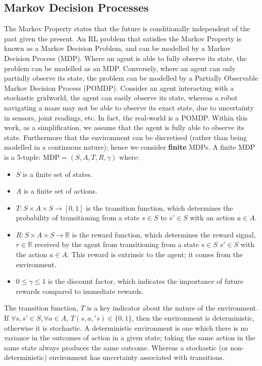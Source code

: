 \subsection{Markov Decision Processes}
The Markov Property states that the future is conditionally independent of the past given the present. An RL problem that satisfies the Markov Property is known as a Markov Decision Problem, and can be modelled by a Markov Decision Process (MDP). Where an agent is able to fully observe its state, the problem can be modelled as an MDP. Conversely, where an agent can only partially observe its state, the problem can be modelled by a Partially Observable Markov Decision Process (POMDP). Consider an agent interacting with a stochastic gridworld, the agent can easily observe its state, whereas a robot navigating a maze may not be able to observe its exact state, due to uncertainty in sensors, joint readings, etc. In fact, the real-world is a POMDP. Within this work, as a simplification, we assume that the agent is fully able to observe its state. Furthermore that the environment can be discretised (rather than being modelled in a continuous nature); hence we consider \textbf{finite} MDPs.
A finite MDP is a 5-tuple: $\text{MDP} = (S,A,T,R, \gamma)$ where:
\begin{itemize}
    \item $S$ is a finite set of states.
    \item $A$ is a finite set of actions.
    \item $T : S \times A \times S \rightarrow [0,1]$ is the transition function, which determines the probability of transitioning from a state $s \in S$ to $s' \in S$ with an action $a \in A$.
    \item $R:S \times A \times S \rightarrow \mathbb{R}$ is the reward function, which determines the reward signal, $r \in \mathbb{R}$ received by the agent from transitioning from a state $s \in S$ $s' \in S$ with the action $a \in A$. This reward is extrinsic to the agent; it comes from the environment.
    \item $0 \le \gamma \le 1$ is the discount factor, which indicates the importance of future rewards compared to immediate rewards.
\end{itemize}
The transition function, $T$ is a key indicator about the nature of the environment.
If $\forall s,s' \in S, \forall a \in A$, $T(s,a,'s) \in \{0,1\}$, then the environment is deterministic, otherwise it is stochastic.
A deterministic environment is one which there is no variance in the outcomes of action in a given state; taking the same action in the same state always produces the same outcome. Whereas a stochastic (or non-deterministic) environment has uncertainty associated with transitions.
